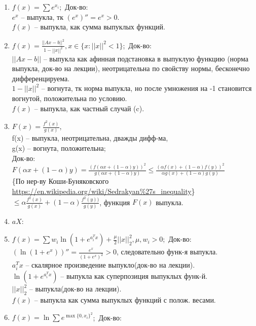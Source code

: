 \documentclass{article}
\renewcommand{\leq}{\leqslant}  %
\begin{document}
\begin{enumerate}[label=(\alph*)]
  \item $f(x) = \sum e^{x_i}$;\, Док-во:\\
      $e^x$ -- выпукла, тк $(e^x)'' = e^x > 0$.\\
      $f(x)$ -- выпукла, как сумма выпуклых функций.
  \item $f(x) = \frac{||Ax - b||^2}{1 - ||x||^2}, x \in \{x: ||x||^2 < 1\}$;\, Док-во:\\
      $||Ax-b||$ -- выпукла как афинная подстановка в выпуклую функцию (норма выпукла, док-во на лекции),
      неотрицательна по свойству нормы, бесконечно дифференцируема.\\
      $1 - ||x||^2$ -- вогнута, тк норма выпукла, но после умножения на -1 становится вогнутой, 
      положительна по условию.\\
      $f(x)$ -- выпукла, как частный случай (c).
  \item $F(x) = \frac{f^2(x)}{g(x)}$,\\ 
      f(x) -- выпукла, неотрицательна, дважды дифф-ма,\\
      g(x) -- вогнута, положительна;\\
      Док-во:\\
      $F(\alpha x + (1 - \alpha) y) 
      = \frac{(f(\alpha x + (1 - \alpha) y))^2}{g(\alpha x + (1 - \alpha) y)} 
      \leq \frac{(\alpha f(x) + (1 - \alpha) f(y))^2}{\alpha g(x) + (1 - \alpha) g(y)}$\\
      \{По нер-ву Коши-Буняковского \url{https://en.wikipedia.org/wiki/Sedrakyan%27s_inequality}\}\\
      $\leq \alpha \frac{f^2(x)}{g(x)} + (1 - \alpha) \frac{f^2(y))}{g(y)}$, функция $F(x)$ выпукла.
  \item $aX$:
  \item $f(x) = \sum w_i \ln(1 + e^{a_i^Tx}) + \frac\mu2||x||^2_2, \mu, w_i > 0$;\, Док-во:\\
      $(\ln(1 + e^x))'' = \frac{e^x}{(1 + e^x)^2} > 0$, следовательно функ-я выпукла.\\
      $a_i^Tx$ -- скалярное произведение выпукло(док-во на лекции).\\
      $\ln(1 + e^{a_i^Tx})$ -- выпукла как суперпозиция выпуклых функ-й.\\
      $||x||^2_2$ -- выпукла(док-во на лекции).\\
      $f(x)$ -- выпукла как сумма выпуклых функций с полож. весами.
  \item $f(x) = \ln \sum e^{\max\{0, x_i\}^2}$;\, Док-во:\\

\end{enumerate}
\end{document}
